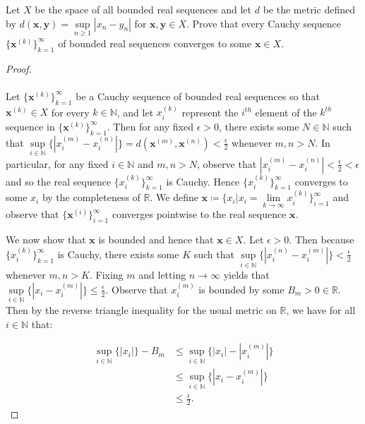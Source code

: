 Let $X$ be the space of all bounded real sequences and let $d$ be the metric
defined by $d(\textbf{x}, \textbf{y}) = \sup\limits_{n \ge 1}{|x_n - y_n|}$
for $\textbf{x}, \textbf{y} \in X$. Prove that every Cauchy sequence 
$\{\textbf{x}^{(k)}\}_{k=1}^{\infty}$ of bounded real sequences converges to some $\textbf{x} \in X$.

\begin{proof}\ \\\\
 Let $\{\textbf{x}^{(k)}\}_{k=1}^{\infty}$ be a Cauchy sequence of bounded real sequences so that
 $\textbf{x}^{(k)} \in X$ for every $k \in \mathbb{N}$, and let $x_i^{(k)}$ represent the $i^{th}$ element of
 the $k^{th}$ sequence in $\{\textbf{x}^{(k)}\}_{k=1}^{\infty}$. Then for any fixed $\epsilon > 0$, there exists some 
 $N \in \mathbb{N}$ such that \linebreak
 $\sup\limits_{i \in \mathbb{N}}{\{|x_i^{(m)} - x_i^{(n)}|\}} = d(\textbf{x}^{(m)}, \textbf{x}^{(n)}) < \frac{\epsilon}{2}$
 whenever $m, n > N$. In particular, for any fixed $i \in \mathbb{N}$ and $m, n > N$, observe that
 $|x_i^{(m)} - x_i^{(n)}| < \frac{\epsilon}{2} < \epsilon$ and so the real sequence
 $\{x_i^{(k)}\}_{k=1}^{\infty}$ is Cauchy. Hence $\{x_i^{(k)}\}_{k=1}^{\infty}$ converges to some $x_i$ by the 
 completeness of $\mathbb{R}$. We define 
 $\textbf{x} \coloneqq \{x_i \vert x_i=\lim\limits_{k \to \infty}{x_i^{(k)}}\}_{i=1}^{\infty}$ and observe that
 $\{\textbf{x}^{(i)}\}_{i=1}^{\infty}$ converges pointwise to the real sequence $\textbf{x}$.
 
 We now show that $\textbf{x}$ is bounded and hence that $\textbf{x} \in X$. Let $\epsilon > 0$. Then because 
 $\{x_i^{(k)}\}_{k=1}^{\infty}$ is Cauchy, there exists some $K$ such that 
 $\sup\limits_{i \in \mathbb{N}}{\{|x_i^{(n)} - x_i^{(m)}|\}} < \frac{\epsilon}{2}$ whenever $m, n > K$. Fixing $m$ and
 letting $n \to \infty$ yields that $\sup\limits_{i \in \mathbb{N}}{\{|x_i - x_i^{(m)}|\}} \le \frac{\epsilon}{2}$. 
 Observe that $x_i^{(m)}$ is bounded by some $B_m > 0 \in \mathbb{R}$. Then by the reverse triangle inequality for the
 usual metric on $\mathbb{R}$, we have for all $i \in \mathbb{N}$ that:

 \begin{align*}
   \sup\limits_{i \in \mathbb{N}}{\{|x_i|\}} - B_m &\le \sup\limits_{i \in \mathbb{N}}{\{|x_i| - |x_i^{(m)}|\}} \\
                                                   &\le \sup\limits_{i \in \mathbb{N}}{\{|x_i - x_i^{(m)}|\}} \\
                                                   &\le \frac{\epsilon}{2}.
 \end{align*}


\end{proof}
